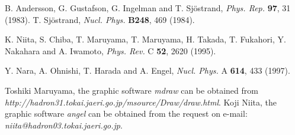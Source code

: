\documentclass[]{article}
\def\Journal#1#2#3#4{{#1} {\bf #2}, #3 (#4)}
\def\NP{\em Nucl. Phys.}
\def\NPA{{\em Nucl. Phys.} A}
\def\PR{{\em Phys. Rev.}}
\def\PRC{{\em Phys. Rev.} C}
\def\PR{{\em Phys. Rep.}}
\begin{document}
\begin{thebibliography}{20}
  B. Andersson, G. Gustafson, G. Ingelman and T. Sj\"ostrand,
     \Journal{\PR}{97}{31}{1983}.
  T. Sj\"ostrand,
     \Journal{\NP}{B248}{469}{1984}.



K. Niita, S. Chiba, T. Maruyama, T. Maruyama, H. Takada, T. Fukahori,
 Y. Nakahara and A. Iwamoto,
    \Journal{\PRC}{52}{2620}{1995}.

   Y. Nara, A. Ohnishi, T. Harada and A. Engel,
    \Journal{\NPA}{614}{433}{1997}.

   Toshiki Maruyama, the graphic software {\it mdraw} can be obtained
   from \\
{\em http://hadron31.tokai.jaeri.go.jp/msource/Draw/draw.html}.
   Koji Niita, the graphic software {\it angel} can be obtained
   from the request on e-mail: {\em niita@hadron03.tokai.jaeri.go.jp}.


\end{thebibliography}{}
\end{document}
